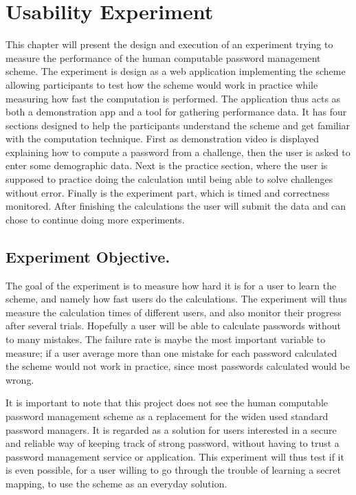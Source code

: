 \chapter{Usability Experiment}\label{ch:experiment}
This chapter will present the design and execution of an experiment trying to measure  the performance of the human computable password management scheme. The experiment is design as a web application implementing the scheme allowing participants to test how the scheme would work in practice while measuring how fast the computation is performed. The application thus acts as both a demonstration app and a tool for gathering performance data. It has four sections designed to help the participants understand the scheme and get familiar with the computation technique. First as demonstration video is displayed explaining how to compute a password from a challenge, then the user is asked to enter some demographic data. Next is the practice section, where the user is supposed to practice doing the calculation until being able to solve challenges without error. Finally is the experiment part, which is timed and correctness monitored. After finishing the calculations the user will submit the data and can chose to continue doing more experiments. 
\section{Experiment Objective.}
The goal of the experiment is to measure how hard it is for a user to learn the scheme, and namely how fast users do the calculations. The experiment will thus measure the calculation times of different users, and also monitor their progress after several trials. Hopefully a user will be able to calculate passwords without to many mistakes. The failure rate is maybe the most important variable to measure; if a user average more than one mistake for each password calculated the scheme would not work in practice, since most passwords calculated would be wrong. 
\par It is important to note that this project does not see the human computable password management scheme as a replacement for the widen used standard password managers. It is regarded as a solution for users interested in a secure and reliable way of keeping track of strong password, without having to trust a password management service or application. This experiment will thus test if it is even possible, for a user willing to go through the trouble of learning a secret mapping, to use the scheme as an everyday solution.

